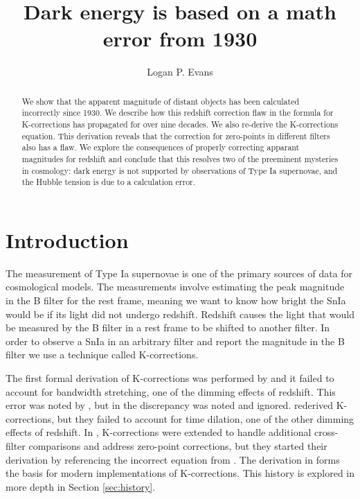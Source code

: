 \documentclass[linenumbers]{aastex631}
\begin{document}
\title{Dark energy is based on a math error from 1930}


\author[0000-0001-6450-3262]{Logan P. Evans}

\begin{abstract}
We show that the apparent magnitude of distant objects has been calculated
incorrectly since 1930. We describe how this redshift correction flaw in the
formula for K-corrections has propagated for over nine decades. We also
re-derive the K-corrections equation. This derivation reveals that the
correction for zero-points in different filters also has a flaw. We explore the
consequences of properly correcting apparant magnitudes for redshift and
conclude that this resolves two of the preeminent mysteries in cosmology: dark
energy is not supported by observations of Type Ia supernovae, and the Hubble
tension is due to a calculation error.
\end{abstract}


\section{Introduction}

The measurement of Type Ia supernovae is one of the primary sources of data for
cosmological models. The measurements involve estimating the peak magnitude in
the B filter \citet{riess1998} for the rest frame, meaning we want to know how
bright the SnIa would be if its light did not undergo redshift. Redshift causes
the light that would be measured by the B filter in a rest frame to be shifted
to another filter. In order to observe a SnIa in an arbitrary filter and report
the magnitude in the B filter we use a technique called K-corrections.

The first formal derivation of K-corrections was performed by
\citet{tolman1930} and it failed to account for bandwidth stretching, one of
the dimming effects of redshift. This error was noted by \citet{desitter1934},
but in \citet{hubble1935} the discrepancy was noted and ignored.
\citet{oke1968} rederived K-corrections, but they failed to account for time
dilation, one of the other dimming effects of redshift. In \citet{kim1996},
K-corrections were extended to handle additional cross-filter comparisons and
address zero-point corrections, but they started their derivation by
referencing the incorrect equation from \citet{oke1968}. The derivation in
\citet{kim1996} forms the basis for modern implementations of K-corrections.
This history is explored in more depth in Section \ref{sec:history}.
\end{document}
